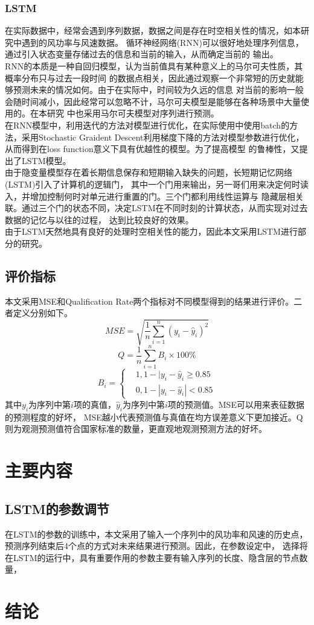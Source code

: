 \documentclass{ctexart}
\begin{document}
\subsubsection{LSTM}
在实际数据中，经常会遇到序列数据，数据之间是存在时空相关性的情况，如本研究中遇到的风功率与风速数据。
循环神经网络(RNN)可以很好地处理序列信息，通过引入状态变量存储过去的信息和当前的输入，从而确定当前的
输出。\\
\indent RNN的本质是一种自回归模型，认为当前值具有某种意义上的马尔可夫性质，其概率分布只与过去一段时间
的数据点相关，因此通过观察一个非常短的历史就能够预测未来的情况如何。由于在实际中，时间较为久远的信息
对当前的影响一般会随时间减小，因此经常可以忽略不计，马尔可夫模型是能够在各种场景中大量使用的。在本研究
中也采用马尔可夫模型对序列进行预测。\\
\indent 在RNN模型中，利用迭代的方法对模型进行优化，在实际使用中使用batch的方法，采用Stochastic Graident 
Descent利用梯度下降的方法对模型参数进行优化，从而得到在loss function意义下具有优越性的模型。为了提高模型
的鲁棒性，又提出了LSTM模型。\\
\indent 由于隐变量模型存在着长期信息保存和短期输入缺失的问题，长短期记忆网络(LSTM)引入了计算机的逻辑门，
其中一个门用来输出，另一哥们用来决定何时读入，并增加控制何时对单元进行重置的门。三个门都利用线性运算与
隐藏层相关联。通过三个门的状态不同，决定LSTM在不同时刻的计算状态，从而实现对过去数据的记忆与以往的过程，
达到比较良好的效果。\\
\indent 由于LSTM天然地具有良好的处理时空相关性的能力，因此本文采用LSTM进行部分的研究。
\subsection{评价指标}
本文采用MSE和Qualification Rate两个指标对不同模型得到的结果进行评价。二者定义分别如下。\\
\begin{equation}
    MSE = \sqrt{\frac{1}{n}\sum_{i=1}^n (y_i-\hat{y}_i)^2}
\end{equation}
\begin{equation}
    Q = \frac{1}{n}\sum_{i=1}^n B_i\times 100\%
\end{equation}
\begin{equation}
    B_i = \left\{
        \begin{aligned}
            &1, 1-|y_i-\hat{y}_i \geq 0.85\\
            &0, 1-|y_i-\hat{y}_i| < 0.85
        \end{aligned}
        \right .
\end{equation}
其中$y_i$为序列中第$i$项的真值，$\hat{y}_i$为序列中第$i$项的预测值。MSE可以用来表征数据的预测程度的好坏，
MSE越小代表预测值与真值在均方误差意义下更加接近。Q则为观测预测值符合国家标准的数量，更直观地观测预测方法的好坏。

\section{主要内容}
\subsection{LSTM的参数调节}
在LSTM的参数的训练中，本文采用了输入一个序列中的风功率和风速的历史点，预测序列结束后4个点的方式对未来结果进行预测。因此，在参数设定中，
选择将
在LSTM的运行中，具有重要作用的参数主要有输入序列的长度、隐含层的节点数量，

\section{结论}
\end{document}
